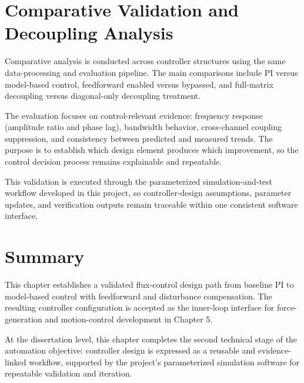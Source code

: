 \section{Comparative Validation and Decoupling Analysis}

Comparative analysis is conducted across controller structures using the same data-processing and evaluation pipeline. The main comparisons include PI versus model-based control, feedforward enabled versus bypassed, and full-matrix decoupling versus diagonal-only decoupling treatment.

The evaluation focuses on control-relevant evidence: frequency response (amplitude ratio and phase lag), bandwidth behavior, cross-channel coupling suppression, and consistency between predicted and measured trends. The purpose is to establish which design element produces which improvement, so the control decision process remains explainable and repeatable.

This validation is executed through the parameterized simulation-and-test workflow developed in this project, so controller-design assumptions, parameter updates, and verification outputs remain traceable within one consistent software interface.

\section{Summary}

This chapter establishes a validated flux-control design path from baseline PI to model-based control with feedforward and disturbance compensation. The resulting controller configuration is accepted as the inner-loop interface for force-generation and motion-control development in Chapter 5.

At the dissertation level, this chapter completes the second technical stage of the automation objective: controller design is expressed as a reusable and evidence-linked workflow, supported by the project’s parameterized simulation software for repeatable validation and iteration.
